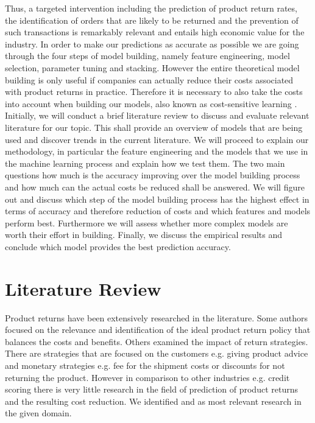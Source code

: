 \documentclass[12pt]{article}
\begin{document}
Thus, a targeted intervention including the prediction of product return rates, the identification of orders that are likely to be returned and the prevention of such transactions is remarkably relevant and entails high economic value for the industry. In order to make our predictions as accurate as possible we are going through the four steps of model building, namely feature engineering, model selection, parameter tuning and stacking. However the entire theoretical model building is only useful if companies can actually reduce their costs associated with product returns in practice. Therefore it is necessary to also take the costs into account when building our models, also known as cost-sensitive learning \cite{zadrozny2003cost}. Initially, we will conduct a brief literature review to discuss and evaluate relevant literature for our topic. This shall provide an overview of models that are being used and discover trends in the current literature. We will proceed to explain our methodology, in particular the feature engineering and the models that we use in the machine learning process and explain how we test them. The two main questions how much is the accuracy improving over the model building process and how much can the actual costs be reduced shall be answered. We will figure out and discuss which step of the model building process has the highest effect in terms of accuracy and therefore reduction of costs and which features and models perform best. Furthermore we will assess whether more complex models are worth their effort in building. Finally, we discuss the empirical results and conclude which model provides the best prediction accuracy.

\section{Literature Review}
Product returns have been extensively researched in the literature. Some authors focused on the relevance and identification of the ideal product return policy that balances the costs and benefits. Others examined the impact of return strategies. There are strategies that are focused on the customers e.g. giving product advice and monetary strategies e.g. fee for the shipment costs or discounts for not returning the product. However in comparison to other industries e.g. credit scoring \cite{crook2007recent}\cite{kumar2007bankruptcy} there is very little research in the field of prediction of product returns and the resulting cost reduction. We identified \cite{yu2008hybrid} and \cite{urbanke2015predicting} as most relevant research in the given domain.
\end{document}
